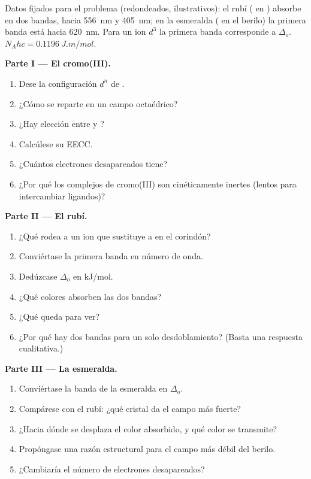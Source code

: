\begin{problem}
\label{pb:b2:ligand-field:1}
Datos fijados para el problema (redondeados, ilustrativos): el rubí ( en ) absorbe
en dos bandas, hacia \qty{556}{nm} y \qty{405}{nm}; en la esmeralda ( en el berilo) la
primera banda está hacia \qty{620}{nm}. Para un ion $d^3$ la primera banda corresponde a
$\Delta_o$. $N_Ahc = \qty{0.1196}{J.m/mol}$.

\medskip
\noindent\textbf{Parte I --- El cromo(III).}
\begin{enumerate}
  \item Dese la configuración $d^n$ de .
  \item ¿Cómo se reparte en un campo octaédrico?
  \item ¿Hay elección entre  y ?
  \item Calcúlese su EECC.
  \item ¿Cuántos electrones desapareados tiene?
  \item ¿Por qué los complejos de cromo(III) son cinéticamente inertes (lentos para intercambiar ligandos)?
\end{enumerate}

\medskip
\noindent\textbf{Parte II --- El rubí.}
\begin{enumerate}[resume]
  \item ¿Qué rodea a un ion  que sustituye a  en el corindón?
  \item Conviértase la primera banda en número de onda.
  \item Dedúzcase $\Delta_o$ en \unit{kJ/mol}.
  \item ¿Qué colores absorben las dos bandas?
  \item ¿Qué queda para ver?
  \item ¿Por qué hay dos bandas para un solo desdoblamiento? (Basta una respuesta cualitativa.)
\end{enumerate}

\medskip
\noindent\textbf{Parte III --- La esmeralda.}
\begin{enumerate}[resume]
  \item Conviértase la banda de la esmeralda en $\Delta_o$.
  \item Compárese con el rubí: ¿qué cristal da el campo más fuerte?
  \item ¿Hacia dónde se desplaza el color absorbido, y qué color se transmite?
  \item Propóngase una razón estructural para el campo más débil del berilo.
  \item ¿Cambiaría el número de electrones desapareados?
\end{enumerate}


\end{problem}
